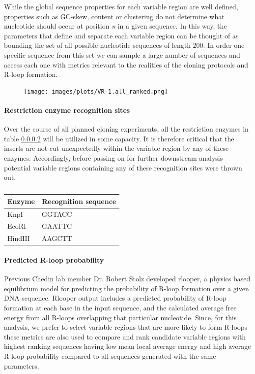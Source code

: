 \documentclass[11pt]{article}
\begin{document}


While the global sequence properties for each variable region are well defined, properties such as GC-skew, content or clustering do not determine what nucleotide should occur at position \emph{n} in a given sequence. In this way, the parameters that define and separate each variable region can be thought of as bounding the set of all possible nucleotide sequences of length 200. In order one specific sequence from this set we can sample a large number of sequences and access each one with metrics relevant to the realities of the cloning protocols and R-loop formation. 

\begin{figure}[H]
	\texttt{[image: images/plots/VR-1.all\_ranked.png]}
	\centering
	\caption{}
	\label{ranking}
\end{figure}


\paragraph{Restriction enzyme recognition sites}

Over the course of all planned cloning experiments, all the restriction enzymes in table \ref{} will be utilized in some capacity. It is therefore critical that the inserts are not cut unexpectedly within the variable region by any of these enzymes. Accordingly, before passing on for further downstream analysis potential variable regions containing any of these recognition sites were thrown out. 

\begin{table}[H]
	\caption{}
	\label{tab:enzymes}
	\centering
	\begin{tabular}{@{}ll@{}}
		\toprule
		Enzyme  & Recognition sequence \\ \midrule
		KnpI    & GGTACC               \\
		EcoRI   & GAATTC               \\
		HindIII & AAGCTT               \\ \bottomrule
	\end{tabular}
\end{table}


\paragraph{Predicted R-loop probability}

Previous Chedin lab member Dr. Robert Stolz developed rlooper, a physics based equilibrium model for predicting the probability of R-loop formation over a given DNA sequence. Rlooper output includes a predicted probability of R-loop formation at each base in the input sequence, and the calculated average free energy from all R-loops overlapping that particular nucleotide. Since, for this analysis, we prefer to select variable regions that are more likely to form R-loops these metrics are also used to compare and rank candidate variable regions with highest ranking sequences having low mean local average energy and high average R-loop probability compared to all sequences generated with the same parameters. 
\end{document}
